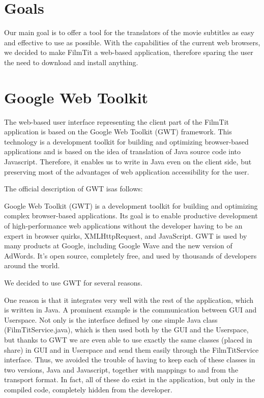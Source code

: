 
\section{Goals}
Our main goal is to offer a tool for the translators of the movie subtitles as easy and effective to use as possible. With the capabilities of the current web browsers, we decided to make FilmTit a web-based application, therefore sparing the user the need to download and install anything.

\section{Google Web Toolkit}
The web-based user interface representing the client part of the FilmTit application is based on the Google Web Toolkit (GWT) framework. This technology is a development toolkit for building and optimizing browser-based applications %
and is based on the idea of translation of Java source code into Javascript. Therefore, it enables us to write in Java even on the client side, but preserving most of the advantages of web application accessibility for the user.

The official description of GWT isas follows:

Google Web Toolkit (GWT) is a development toolkit for building and optimizing complex browser-based applications. Its goal is to enable productive development of high-performance web applications without the developer having to be an expert in browser quirks, XMLHttpRequest, and JavaScript. GWT is used by many products at Google, including Google Wave and the new version of AdWords. It's open source, completely free, and used by thousands of developers around the world.

We decided to use GWT for several reasons.

One reason is that it integrates very well with the rest of the application, which is written in Java. A prominent example is the communication between GUI and Userspace. Not only is the interface defined by one simple Java class (FilmTitService.java), which is then used both by the GUI and the Userspace, but thanks to GWT we are even able to use exactly the same classes (placed in share) in GUI and in Userspace and send them easily through the FilmTitService interface. Thus, we avoided the trouble of having to keep each of these classes in two versions, Java and Javascript, together with mappings to and from the transport format. In fact, all of these do exist in the application, but only in the compiled code, completely hidden from the developer.

